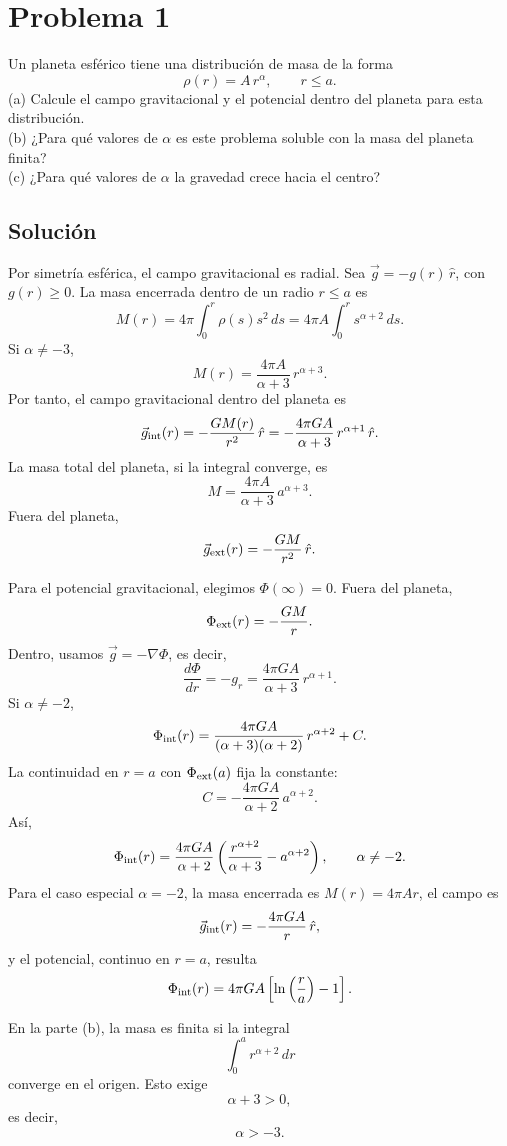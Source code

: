 \documentclass[a4paper]{article}
\begin{document}
\tableofcontents

\section{Problema 1}

Un planeta esférico tiene una distribución de masa de la forma
$$
\rho(r)=A\,r^\alpha,\qquad r\le a.
$$
(a) Calcule el campo gravitacional y el potencial dentro del planeta para esta distribución. \\
(b) ¿Para qué valores de $\alpha$ es este problema soluble con la masa del planeta finita? \\
(c) ¿Para qué valores de $\alpha$ la gravedad crece hacia el centro?



\subsection{Solución}
Por simetría esférica, el campo gravitacional es radial. Sea $\vec g=-g(r)\,\hat r$, con $g(r)\ge 0$. La masa encerrada dentro de un radio $r\le a$ es
$$
M(r)=4\pi\int_0^r \rho(s)s^2\,ds
=4\pi A\int_0^r s^{\alpha+2}\,ds.
$$
Si $\alpha\neq -3$,
$$
M(r)=\frac{4\pi A}{\alpha+3}\,r^{\alpha+3}.
$$
Por tanto, el campo gravitacional dentro del planeta es
$$
\vec g_{\rm int}(r)
=-\frac{G M(r)}{r^2}\,\hat r
=-\frac{4\pi G A}{\alpha+3}\,r^{\alpha+1}\,\hat r.
$$
La masa total del planeta, si la integral converge, es
$$
M=\frac{4\pi A}{\alpha+3}\,a^{\alpha+3}.
$$
Fuera del planeta,
$$
\vec g_{\rm ext}(r)=-\frac{GM}{r^2}\,\hat r.
$$

Para el potencial gravitacional, elegimos $\Phi(\infty)=0$. Fuera del planeta,
$$
\Phi_{\rm ext}(r)=-\frac{GM}{r}.
$$
Dentro, usamos $\vec g=-\nabla\Phi$, es decir,
$$
\frac{d\Phi}{dr}=-g_r
=\frac{4\pi G A}{\alpha+3}\,r^{\alpha+1}.
$$
Si $\alpha\neq -2$,
$$
\Phi_{\rm int}(r)
=\frac{4\pi G A}{(\alpha+3)(\alpha+2)}\,r^{\alpha+2}+C.
$$
La continuidad en $r=a$ con $\Phi_{\rm ext}(a)$ fija la constante:
$$
C=-\frac{4\pi G A}{\alpha+2}\,a^{\alpha+2}.
$$
Así,
$$
\Phi_{\rm int}(r)
=
\frac{4\pi G A}{\alpha+2}
\left(
\frac{r^{\alpha+2}}{\alpha+3}-a^{\alpha+2}
\right),
\qquad \alpha\neq -2.
$$
Para el caso especial $\alpha=-2$, la masa encerrada es $M(r)=4\pi A r$, el campo es
$$
\vec g_{\rm int}(r)=-\frac{4\pi G A}{r}\,\hat r,
$$
y el potencial, continuo en $r=a$, resulta
$$
\Phi_{\rm int}(r)=4\pi G A\left[\ln\left(\frac{r}{a}\right)-1\right].
$$

En la parte (b), la masa es finita si la integral
$$
\int_0^a r^{\alpha+2}\,dr
$$
converge en el origen. Esto exige
$$
\alpha+3>0,
$$
es decir,
$$
\boxed{\alpha>-3.}
$$
\end{document}
